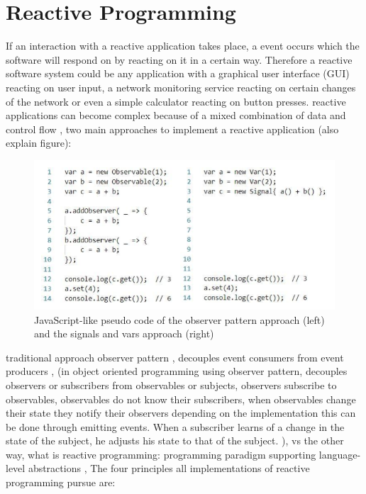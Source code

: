 \documentclass[Bachelor,BIF,english]{twbook}
\begin{document}
\section{Reactive Programming}
If an interaction with a reactive application takes place, a event occurs which the software will respond on by reacting on it in a certain way. Therefore a reactive software system could be any application with a graphical user interface (GUI) reacting on user input, a network monitoring service reacting on certain changes of the network or even a simple calculator reacting on button presses. reactive applications can become complex because of a mixed combination of data and control flow \cite[p.~1]{PositivEffectOfRP}, 
two main approaches to implement a reactive application (also explain figure):
\begin{figure}[!htbp]
\centering
\includegraphics[width=0.75\linewidth]{PICs/pseudo_Code_reactive_2_ways.png}
\caption{JavaScript-like pseudo code of the observer pattern approach (left) and the signals and vars approach (right) \cite[p.~797]{DebuggingRP} \cite[p.~3]{PositivEffectOfRP}}\label{Fig1}
\end{figure}
traditional approach observer pattern \cite[p.~360-372]{ObserverDP}, decouples event consumers from event producers \cite[p.~953]{RPWalkthrough}, (in object oriented programming using observer pattern, decouples observers or subscribers from observables or subjects, observers subscribe to observables, observables do not know their subscribers, when observables change their state they notify their observers depending on the implementation this can be done through emitting events. When a subscriber learns of a change in the state of the subject, he adjusts his state to that of the subject. \cite[p.~363]{ObserverDP}),
vs the other way, what is reactive programming: programming paradigm supporting language-level abstractions \cite[p.~953]{RPWalkthrough}, The four principles all implementations of reactive programming pursue are:
\end{document}
